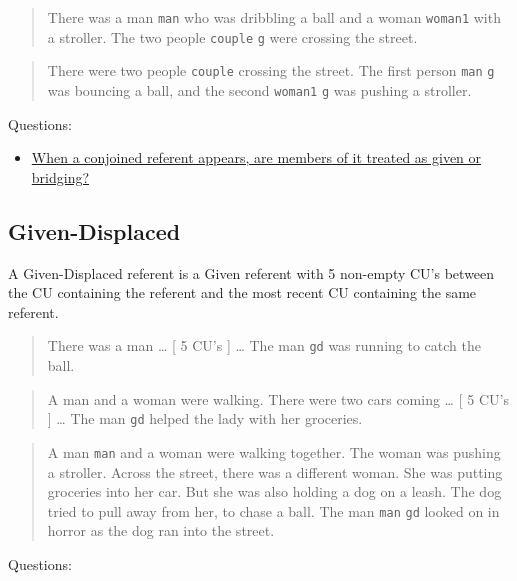 \documentclass[
]{book}
\providecommand{\tightlist}{%
  \setlength{\itemsep}{0pt}\setlength{\parskip}{0pt}}
\begin{document}
\begin{quote}
There was a man \texttt{man} who was dribbling a ball and a woman \texttt{woman1} with a stroller.
The two people \texttt{couple} \texttt{g} were crossing the street.
\end{quote}

\begin{quote}
There were two people \texttt{couple} crossing the street.
The first person \texttt{man} \texttt{g} was bouncing a ball,
and the second \texttt{woman1} \texttt{g} was pushing a stroller.
\end{quote}

Questions:

\begin{itemize}
\tightlist
\item
  \protect\hyperlink{conjoined-referent-members}{When a conjoined referent appears, are members of it treated as given or bridging?}
\end{itemize}

\hypertarget{given-displaced}{%
\subsection{Given-Displaced}\label{given-displaced}}

A Given-Displaced referent is a Given referent with 5 non-empty CU's between the CU containing the referent and the most recent CU containing the same referent.

\begin{quote}
There was a man \ldots{}
{[} 5 CU's {]} \ldots{}
The man \texttt{gd} was running to catch the ball.
\end{quote}

\begin{quote}
A man and a woman were walking.
There were two cars coming \ldots{}
{[} 5 CU's {]} \ldots{}
The man \texttt{gd} helped the lady with her groceries.
\end{quote}

\begin{quote}
A man \texttt{man} and a woman were walking together.
The woman was pushing a stroller.
Across the street, there was a different woman.
She was putting groceries into her car.
But she was also holding a dog on a leash.
The dog tried to pull away from her, to chase a ball.
The man \texttt{man} \texttt{gd} looked on in horror as the dog ran into the street.
\end{quote}

Questions:
\end{document}
